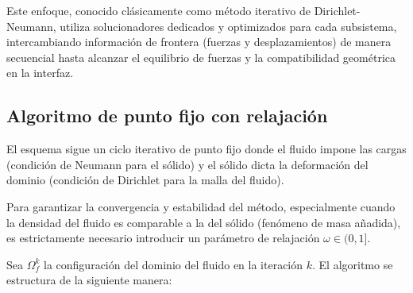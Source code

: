 \documentclass[12pt, letterpaper]{report}
\theoremstyle{definition}
\begin{document}
Este enfoque, conocido clásicamente como método iterativo de Dirichlet-Neumann, utiliza solucionadores dedicados y optimizados para cada subsistema, intercambiando información de frontera (fuerzas y desplazamientos) de manera secuencial hasta alcanzar el equilibrio de fuerzas y la compatibilidad geométrica en la interfaz.

\subsection{Algoritmo de punto fijo con relajación}

El esquema sigue un ciclo iterativo de punto fijo donde el fluido impone las cargas (condición de Neumann para el sólido) y el sólido dicta la deformación del dominio (condición de Dirichlet para la malla del fluido).

Para garantizar la convergencia y estabilidad del método, especialmente cuando la densidad del fluido es comparable a la del sólido (fenómeno de masa añadida), es estrictamente necesario introducir un parámetro de relajación $\omega \in (0, 1]$.

Sea $\Omega_f^k$ la configuración del dominio del fluido en la iteración $k$. El algoritmo se estructura de la siguiente manera:
\end{document}
